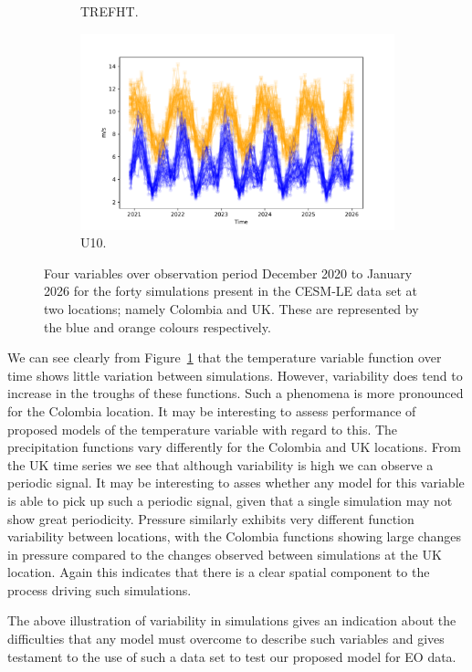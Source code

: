 \begin{figure}[htbp!]
\begin{subfigure}[b]{0.45\textwidth}
		\caption{TREFHT.}
		\label{fig:std_temp_temp}   
	\end{subfigure}             
	\begin{subfigure}[b]{0.45\textwidth}
		\includegraphics[width=\textwidth]{U10_std_temp}
		\caption{U10.}
		\label{fig:std_wind_temp}
	\end{subfigure}             
	\caption[Temporal overview of variability of Precipitation, Pressure, Temperature, and Wind speed.]{ Four variables over observation period December 2020 to January 2026 for the forty simulations present in the CESM-LE data set at two locations; namely Colombia and UK. These are represented by the blue and orange colours respectively.}
	\label{fig:std_overview_temp}
\end{figure}

We can see clearly from Figure~\ref{fig:std_temp_temp} that the temperature variable function over time shows little variation between simulations. 
However, variability does tend to increase in the troughs of these functions. 
Such a phenomena is more pronounced for the Colombia location. 
It may be interesting to assess performance of proposed models of the temperature variable with regard to this.
The precipitation functions vary differently for the Colombia and UK locations.
From the UK time series we see that although variability is high we can observe a periodic signal. 
It may be interesting to asses whether any model for this variable is able to pick up such a periodic signal, given that a single simulation may not show great periodicity.
Pressure similarly exhibits very different function variability between locations, with the Colombia functions showing large changes in pressure compared to the changes observed between simulations at the UK location. 
Again this indicates that there is a clear spatial component to the process driving such simulations. 

The above illustration of variability in simulations gives an indication about the difficulties that any model must overcome to describe such variables and gives testament to the use of such a data set to test our proposed model for EO data.






